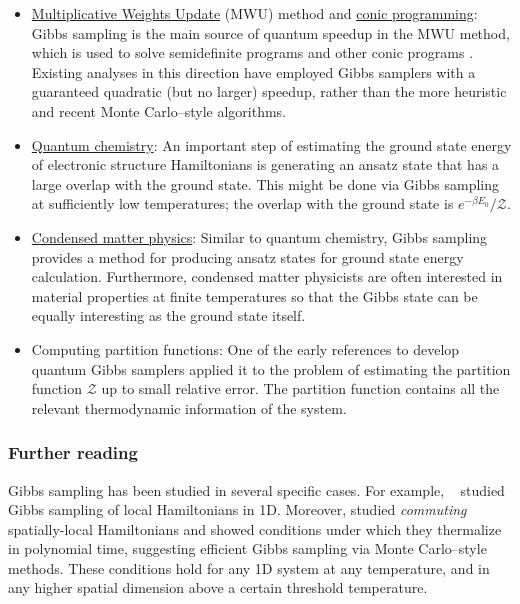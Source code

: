 \begin{refsection}
\begin{itemize}
    \item \hyperref[prim:MWU]{Multiplicative Weights Update} (MWU) method and \hyperref[appl:ConicProgramming]{conic programming}: Gibbs sampling is the main source of quantum speedup in the MWU method, which is used to solve semidefinite programs and other conic programs \cite{brandao2016QSDPSpeedup,brandao2017QSDPSpeedupsLearning,apeldoorn2017QSDPSolvers,apeldoorn2018ImprovedQSDPSolving,apeldoorn2019QAlgorithmsForZeroSumGames}. Existing analyses in this direction have employed Gibbs samplers with a guaranteed quadratic (but no larger) speedup, rather than the more heuristic and recent Monte Carlo--style algorithms.
    \item \hyperref[appl:QuantumChemistry]{Quantum chemistry}: An important step of estimating the ground state energy of electronic structure Hamiltonians is generating an ansatz state that has a large overlap with the ground state. This might be done via Gibbs sampling at sufficiently low temperatures; the overlap with the ground state is $e^{-\beta E_0}/\mathcal{Z}$. 
    \item \hyperref[appl:CondensedMatter]{Condensed matter physics}: Similar to quantum chemistry, Gibbs sampling provides a method for producing ansatz states for ground state energy calculation. Furthermore, condensed matter physicists are often interested in material properties at finite temperatures so that the Gibbs state can be equally interesting as the ground state itself. 
    \item Computing partition functions: One of the early references to develop quantum Gibbs samplers \cite{poulin2009GibbsSamplingAndEval} applied it to the problem of estimating the partition function $\mathcal{Z}$ up to small relative error. The partition function contains all the relevant thermodynamic information of the system.
\end{itemize}


 \subsubsection*{Further reading}

Gibbs sampling has been studied in several specific cases. For example, ~\cite{bilgin2010PreparingThermalStates} studied Gibbs sampling of local Hamiltonians in 1D. Moreover, \cite{kastoryano2016GibbsSamplingCommutingCase} studied \textit{commuting} spatially-local Hamiltonians and showed conditions under which they thermalize in polynomial time, suggesting efficient Gibbs sampling via Monte Carlo--style methods. These conditions hold for any 1D system at any temperature, and in any higher spatial dimension above a certain threshold temperature.

\printbibliography[heading=secbib,segment=\therefsegment]

\end{refsection}